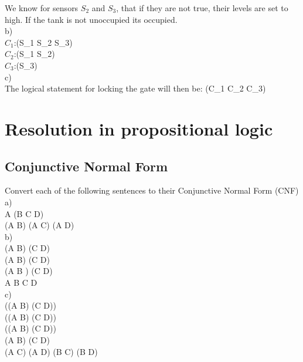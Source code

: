 \documentclass{article}
\begin{document}
\noindent We know for sensors $S_2$ and $S_3$, that if they are not true, their levels are set to high. If the tank is not unoccupied its occupied.\\

b)\\
$C_1$:(\neg S_1 \wedge S_2 \wedge S_3)\\
$C_2$:(S_1 \wedge \neg S_2)\\
$C_3$:(\neg S_3)\\

c)\\
The logical statement for locking the gate will then be: (C_1 \vee C_2 \vee C_3)\\

\section{Resolution in propositional logic}

\subsection{Conjunctive Normal Form}

Convert each of the following sentences to their Conjunctive Normal Form (CNF)\\

a)\\
A \vee (B \wedge C \wedge \neg D)\\
(A \vee B) \wedge (A \vee C) \wedge (A \vee \neg D)\\

b)\\
\neg (A \Rightarrow \neg B) \wedge \neg (C \Rightarrow \neg D)\\
\neg (\neg A \vee \neg B) \wedge \neg (\neg C \vee \neg D)\\
(A \wedge B ) \wedge (C \wedge D)\\
A \wedge B \wedge C \wedge D\\

c)\\
\neg ((A \Rightarrow B) \wedge (C \Rightarrow D))\\
\neg ((\neg A \vee B) \wedge (\neg C \vee D))\\
(\neg (\neg A \vee B) \vee \neg(\neg C \vee D))\\
(A \wedge \neg B) \vee (C \wedge \neg D)\\
(A \vee C) \wedge (A \vee \neg D) \wedge (\neg B \vee C) \wedge (\neg B \vee \neg D)\\
\end{document}

